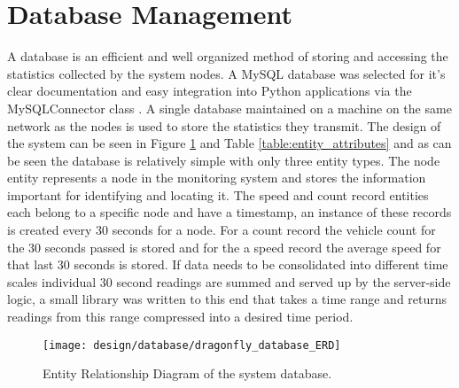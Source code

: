 \section{Database Management}

A database is an efficient and well organized method of storing and accessing the statistics collected by the system nodes. A MySQL database was selected for it's clear documentation and easy integration into Python applications via the MySQLConnector class \cite{mysqlconnector}. A single database maintained on a machine on the same network as the nodes is used to store the statistics they transmit. The design of the system can be seen in Figure \ref{fig:erd} and Table \ref{table:entity_attributes} and as can be seen the database is relatively simple with only three entity types. The node entity represents a node in the monitoring system and stores the information important for identifying and locating it. The speed and count record entities each belong to a specific node and have a timestamp, an instance of these records is created every 30 seconds for a node. For a count record the vehicle count for the 30 seconds passed is stored and for the a speed record the average speed for that last 30 seconds is stored. If data needs to be consolidated into different time scales individual 30 second readings are summed and served up by the server-side logic, a small library was written to this end that takes a time range and returns readings from this range compressed into a desired time period. 

\begin{figure}[H]
    \centering
    \centering\texttt{[image: design/database/dragonfly\_database\_ERD]}
    \caption{Entity Relationship Diagram of the system database.}
    \label{fig:erd}
  \end{figure}

